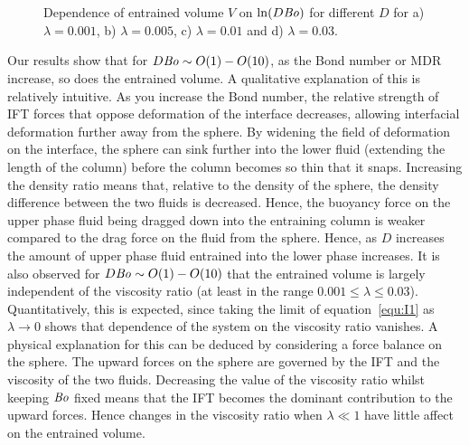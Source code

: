 \documentclass[12pt]{article}
\newcommand\Bo{\mbox{\textit{Bo}}}  %
\begin{document}
    \begin{figure}
      \centering
      \begin{subfigure}[b]{0.45\textwidth}
        \resizebox{\textwidth}{!}{\Large }
        \caption{}
        \label{fig:viscos_rat=0.001_DBo}
      \end{subfigure}
      ~
      \begin{subfigure}[b]{0.45\textwidth}
        \resizebox{\textwidth}{!}{\Large }
        \caption{}
        \label{fig:viscos_rat=0.005_DBo}
      \end{subfigure}
      
      \begin{subfigure}[b]{0.45\textwidth}
        \resizebox{\textwidth}{!}{\Large }
        \caption{}
        \label{fig:viscos_rat=0.01_DBo}
      \end{subfigure}
      ~
      \begin{subfigure}[b]{0.45\textwidth}
        \resizebox{\textwidth}{!}{\Large }
        \caption{}
        \label{fig:mdr=viscos_rat=0.03_DBo}
      \end{subfigure}
      \caption{Dependence of entrained volume $V$ on $\ln(D \Bo)$ for different $D$ for a) $\lambda = 0.001$, b) $\lambda = 0.005$, c) $\lambda = 0.01$ and d) $\lambda = 0.03$. }\label{fig:viscos_snap_DBo}
    \end{figure}

Our results show that for $D \Bo \sim O(1) - O(10)$, as the Bond number or MDR increase, so does the entrained volume. A qualitative explanation of this is relatively intuitive. As you increase the Bond number, the relative strength of IFT forces that oppose deformation of the interface decreases, allowing interfacial deformation further away from the sphere. By widening the field of deformation on the interface, the sphere can sink further into the lower fluid (extending the length of the column) before the column becomes so thin that it snaps. Increasing the density ratio means that, relative to the density of the sphere, the density difference between the two fluids is decreased. Hence, the buoyancy force on the upper phase fluid being dragged down into the entraining column is weaker compared to the drag force on the fluid from the sphere. Hence, as $D$ increases the amount of upper phase fluid entrained into the lower phase increases. It is also observed for $D \Bo \sim O(1) - O(10)$ that the entrained volume is largely independent of the viscosity ratio (at least in the range $0.001 \leq \lambda \leq 0.03$). Quantitatively, this is expected, since taking the limit of equation~\ref{equ:I1} as $\lambda \to 0$ shows that dependence of the system on the viscosity ratio vanishes. A physical explanation for this can be deduced by considering a force balance on the sphere. The upward forces on the sphere are governed by the IFT and the viscosity of the two fluids. Decreasing the value of the viscosity ratio whilst keeping $\Bo$ fixed means that the IFT becomes the dominant contribution to the upward forces. Hence changes in the viscosity ratio when $\lambda \ll 1$ have little affect on the entrained volume. 
\end{document}
